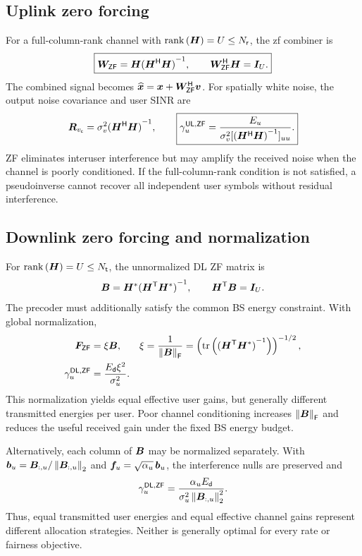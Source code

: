 \subsection{Uplink zero forcing}
For a full-column-rank channel with $\operatorname{rank}\left(\bm{H}\right)=U\leq N_{\mathsf{r}}$, the \ac{zf} combiner is
\begin{equation}
	\boxed{
		\bm{W}_{\mathsf{ZF}}=\bm{H}{({\bm{H}}^{\mathsf{H}}\bm{H})}^{-1},
		\qquad
		{\bm{W}}^{\mathsf{H}}_{\mathsf{ZF}}\bm{H}=\bm{I}_U.
	}
	\label{eq:ulzf}
\end{equation}
The combined signal becomes $\widehat{\bm{x}}=\bm{x}+{\bm{W}}^{\mathsf{H}}_{\mathsf{ZF}}\bm{v}$. For spatially white noise, the output noise covariance and user SINR are
\begin{equation}
	\bm{R}_{v_{\mathsf c}}
	=\sigma_v^2{({\bm{H}}^{\mathsf{H}}\bm{H})}^{-1},
	\qquad
	\boxed{
		\gamma_u^{\mathsf{UL},\mathsf{ZF}}
		=\frac{E_u}
		{\sigma_v^2[{({\bm{H}}^{\mathsf{H}}\bm{H})}^{-1}]_{uu}}.
	}
	\label{eq:ulzfsinr}
\end{equation}
ZF eliminates interuser interference but may amplify the received noise when the channel is poorly conditioned. If the full-column-rank condition is not satisfied, a pseudoinverse cannot recover all independent user symbols without residual interference.

\subsection{Downlink zero forcing and normalization}
For $\operatorname{rank}\left(\bm{H}\right)=U\leq N_{\mathsf{t}}$, the unnormalized DL ZF matrix is
\begin{equation}
	\bm{B}=\bm{H}^*{({\bm{H}}^{\mathsf{T}}\bm{H}^*)}^{-1},
	\qquad
	{\bm{H}}^{\mathsf{T}}\bm{B}=\bm{I}_U.
	\label{eq:dlzfdirection}
\end{equation}
The precoder must additionally satisfy the common BS energy constraint. With global normalization,
\begin{align}
	\bm{F}_{\mathsf{ZF}}&=\xi\bm{B},
	&
	\xi&=\frac{1}{\left\|\bm{B}\right\|_{\mathsf{F}}}
	=\left(\operatorname{tr}\left({({\bm{H}}^{\mathsf{T}}\bm{H}^*)}^{-1}\right)\right)^{-1/2},
	\label{eq:dlzf}\\
	\gamma_u^{\mathsf{DL},\mathsf{ZF}}&=\frac{E_{\mathsf{d}}\xi^2}{\sigma_u^2}.
	\label{eq:dlzfsinr}
\end{align}
This normalization yields equal effective user gains, but generally different transmitted energies per user. Poor channel conditioning increases $\left\|\bm{B}\right\|_{\mathsf{F}}$ and reduces the useful received gain under the fixed BS energy budget.

Alternatively, each column of $\bm{B}$ may be normalized separately. With $\bm{b}_u=\bm{B}_{:,u}/\left\|\bm{B}_{:,u}\right\|_2$ and $\bm{f}_u=\sqrt{\alpha_u}\,\bm{b}_u$, the interference nulls are preserved and
\begin{equation*}
	\gamma_u^{\mathsf{DL},\mathsf{ZF}}
	=\frac{\alpha_u E_{\mathsf{d}}}{\sigma_u^2\left\|\bm{B}_{:,u}\right\|_2^2}.
\end{equation*}
Thus, equal transmitted user energies and equal effective channel gains represent different allocation strategies. Neither is generally optimal for every rate or fairness objective.


